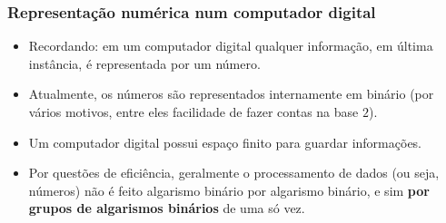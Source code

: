 \documentclass{beamer}
\begin{document}
\begin{frame}
\frametitle{Representação numérica num computador digital}

\begin{itemize}
\item Recordando: em um computador digital qualquer informação, em última instância, é representada por um número.
\pause
\item Atualmente, os números são representados internamente em binário (por vários motivos, entre eles facilidade de fazer contas na base $2$).
\pause
\item Um computador digital possui espaço finito para guardar informações.
\pause
\item Por questões de eficiência, geralmente o processamento de dados (ou seja, números) não é feito algarismo binário por algarismo binário, e sim \textbf{por grupos de algarismos binários} de uma só vez.
\end{itemize}

\pause


\end{frame}
\end{document}
